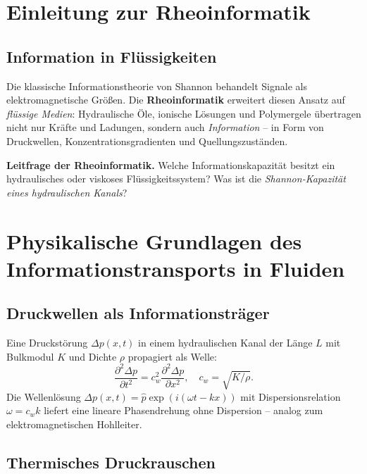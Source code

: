 ﻿\documentclass[a4paper,12pt]{scrreprt}
\theoremstyle{definition}
\begin{document}
\section{Einleitung zur Rheoinformatik}

\subsection{Information in Flüssigkeiten}

Die klassische Informationstheorie von Shannon behandelt Signale als
elektromagnetische Größen. Die \textbf{Rheoinformatik} erweitert
diesen Ansatz auf \emph{flüssige Medien}: Hydraulische Öle,
ionische Lösungen und Polymergele übertragen nicht nur Kräfte und
Ladungen, sondern auch \emph{Information} -- in Form von Druckwellen,
Konzentrationsgradienten und Quellungszuständen.

\begin{infobox}
\textbf{Leitfrage der Rheoinformatik.}
Welche Informationskapazität besitzt ein hydraulisches oder viskoses
Flüssigkeitssystem? Was ist die \emph{Shannon-Kapazität eines
hydraulischen Kanals}?
\end{infobox}

\section{Physikalische Grundlagen des Informationstransports in Fluiden}

\subsection{Druckwellen als Informationsträger}

Eine Druckstörung $\Delta p(x,t)$ in einem hydraulischen Kanal der
Länge $L$ mit Bulkmodul $K$ und Dichte $\rho$ propagiert als Welle:
\[
  \frac{\partial^2 \Delta p}{\partial t^2}
  = c_w^2 \frac{\partial^2 \Delta p}{\partial x^2},
  \quad c_w = \sqrt{K/\rho}.
\]
Die Wellenlösung $\Delta p(x,t) = \hat p \exp(i(\omega t - kx))$ mit
Dispersionsrelation $\omega = c_w k$ liefert eine lineare Phasendrehung
ohne Dispersion -- analog zum elektromagnetischen Hohlleiter.

\subsection{Thermisches Druckrauschen}
\end{document}
